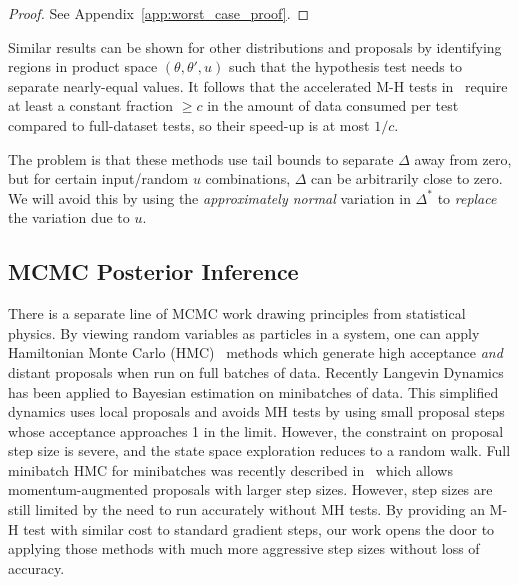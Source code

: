 \documentclass[twoside]{article} \usepackage{aistats2017}
\begin{document}
\begin{proof}
See Appendix~\ref{app:worst_case_proof}.
\end{proof}

Similar results can be shown for other distributions and proposals by
identifying regions in product space $(\theta,\theta',u)$ such that the
hypothesis test needs to separate nearly-equal values.  It follows that the
accelerated M-H tests in~\citet{cutting_mh_2014,icml2014c1_bardenet14} require at
least a constant fraction $\geq c$ in the amount of data consumed per test
compared to full-dataset tests, so their speed-up is at most $1/c$.


The problem is that these methods use tail bounds to separate $\Delta$ away
from zero, but for certain input/random $u$ combinations, $\Delta$ can be
arbitrarily close to zero. We will avoid this by using the {\em approximately
normal} variation in $\Delta^*$ to {\em replace} the variation due to $u$. 

\subsection{MCMC Posterior Inference}
There is a separate line of MCMC work drawing principles from statistical
physics. By viewing random variables as particles in a system, one can apply
Hamiltonian Monte Carlo (HMC)~\citep{mcmc_hamiltonian_2010} methods which
generate high acceptance \emph{and} distant proposals when run on full batches
of data. Recently Langevin Dynamics~\citep{langevin_2011,conf/icml/AhnBW12} has
been applied to Bayesian estimation on minibatches of data. This simplified
dynamics uses local proposals and avoids MH tests by using small proposal steps
whose acceptance approaches 1 in the limit. However, the constraint on proposal
step size is severe, and the state space exploration reduces to a random walk.
Full minibatch HMC for minibatches was recently described in~\citet{sghmc_2014}
which allows momentum-augmented proposals with larger step sizes. However, step
sizes are still limited by the need to run accurately without MH tests.  By providing
an M-H test with similar cost to standard gradient steps, our
work opens the door to applying those methods with much more aggressive step
sizes without loss of accuracy. 
\end{document}
